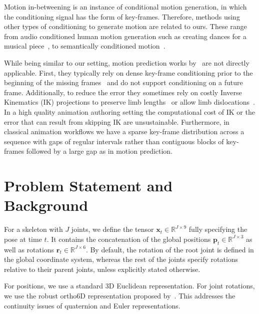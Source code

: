 \documentclass[letterpaper]{article} \usepackage[]{aaai23}  \usepackage{times}  \usepackage{helvet}  \usepackage{courier}  \usepackage[hyphens]{url}  \usepackage{graphicx} \urlstyle{rm} \def\UrlFont{\rm}  \usepackage{natbib}  \usepackage{caption} \frenchspacing  \setlength{\pdfpagewidth}{8.5in} \setlength{\pdfpageheight}{11in}
\renewcommand{\vec}[1]{\mathbf{#1}}
\renewcommand{\Re}{\mathbb{R}}
\begin{document}
Motion in-betweening is an instance of conditional motion generation, in which the conditioning signal has the form of key-frames. Therefore, methods using other types of conditioning to generate motion are related to ours. These range from audio conditioned human motion generation such as creating dances for a musical piece~\cite{kao2020temporally, li2021learn}, to semantically conditioned motion~\cite{chuan2020action2motion, petrovich2021actionconditioned}.

While being similar to our setting, motion prediction works by~\cite{martinez2017rnn, wang2022velocity} are not directly applicable. First, they typically rely on dense key-frame conditioning prior to the beginning of the missing frames~\citep{wang2022velocity} and do not support conditioning on a future frame.
Additionally, to reduce the error they sometimes rely on costly Inverse Kinematics (IK) projections to preserve limb lengths~\cite{wang2022velocity} or allow limb dislocations~\cite{kaufmann2020}. In a high quality animation authoring setting the computational cost of IK or the error that can result from skipping IK are unsustainable. Furthermore, in classical animation workflows we have a sparse key-frame distribution across a sequence with gaps of regular intervals rather than contiguous blocks of key-frames followed by a large gap as in motion prediction.




\section{Problem Statement and Background} \label{sec:problem_statement}

For a skeleton with $J$ joints, we define the tensor $\vec{x}_t \in \Re^{J \times 9}$ fully specifying the pose at time $t$. It contains the concatenation of the global positions $\vec{p}_t \in \Re^{J \times 3}$ as well as rotations $\vec{r}_t \in \Re^{J \times 6}$. By default, the rotation of the root joint is defined in the global coordinate system, whereas the rest of the joints specify rotations relative to their parent joints, unless explicitly stated otherwise. 

For positions, we use a standard 3D Euclidean representation. For joint rotations, we use the robust ortho6D representation proposed by~\citet{zhou2019onthecontinuity}. This addresses the continuity issues of quaternion and Euler representations. 
\end{document}
